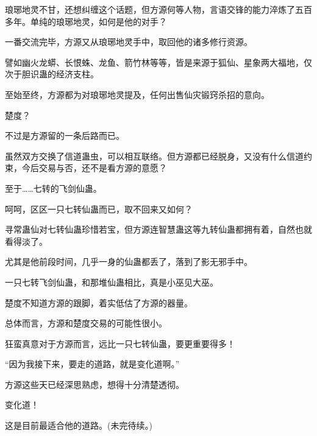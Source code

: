 \begin{this_body}
琅琊地灵不甘，还想纠缠这个话题，但方源何等人物，言语交锋的能力淬炼了五百多年。单纯的琅琊地灵，如何是他的对手？

一番交流完毕，方源又从琅琊地灵手中，取回他的诸多修行资源。

譬如幽火龙蟒、长恨蛛、龙鱼、箭竹林等等，皆是来源于狐仙、星象两大福地，仅次于胆识蛊的经济支柱。

至始至终，方源都为对琅琊地灵提及，任何出售仙灾锻窍杀招的意向。

楚度？

不过是方源留的一条后路而已。

虽然双方交换了信道蛊虫，可以相互联络。但方源都已经脱身，又没有什么信道约束，今后交易与否，还不是看方源的意愿？

至于……七转的飞剑仙蛊。

呵呵，区区一只七转仙蛊而已，取不回来又如何？

寻常蛊仙对七转仙蛊珍惜若宝，但方源连智慧蛊这等九转仙蛊都拥有着，自然也就看得淡了。

尤其是他前段时间，几乎一身的仙蛊都丢了，落到了影无邪手中。

一只七转飞剑仙蛊，和那堆仙蛊相比，真是小巫见大巫。

楚度不知道方源的跟脚，着实低估了方源的器量。

总体而言，方源和楚度交易的可能性很小。

狂蛮真意对于方源而言，远比一只七转仙蛊，要更重要得多！

“因为我接下来，要走的道路，就是变化道啊。”

方源这些天已经深思熟虑，想得十分清楚透彻。

变化道！

这是目前最适合他的道路。(未完待续。)

\end{this_body}

